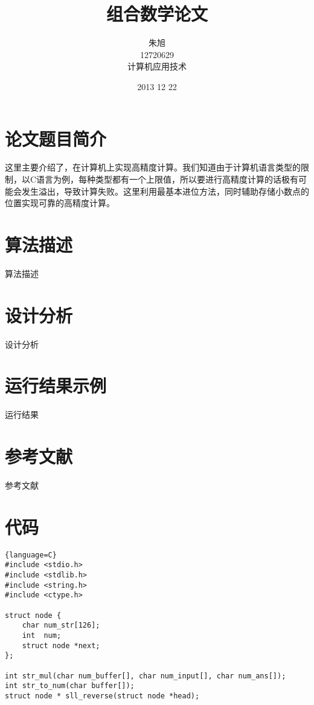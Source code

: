 \documentclass{article}
\title{组合数学论文}
\author{朱旭\\12720629\\计算机应用技术}
\date{2013 12 22}
\begin{document}
\begin{CJK*}{UTF8}{gbsn}%




\maketitle

\section{论文题目简介}
这里主要介绍了，在计算机上实现高精度计算。我们知道由于计算机语言类型的限制，以C语言为例，每种类型都有一个上限值，所以要进行高精度计算的话极有可能会发生溢出，导致计算失败。这里利用最基本进位方法，同时辅助存储小数点的位置实现可靠的高精度计算。

\section{算法描述}
算法描述
\section{设计分析}
设计分析
\section{运行结果示例}
运行结果
\section{参考文献}
参考文献

\section{代码}
\begin{lstlisting}{language=C}
#include <stdio.h>
#include <stdlib.h>
#include <string.h>
#include <ctype.h>

struct node {
    char num_str[126];
    int  num;
    struct node *next;
};

int str_mul(char num_buffer[], char num_input[], char num_ans[]);
int str_to_num(char buffer[]);
struct node * sll_reverse(struct node *head);


\end{lstlisting}
\end{CJK*}
\end{document}
